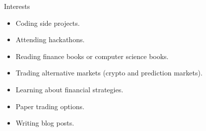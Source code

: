 \documentclass[]{mcdowellcv}
\begin{document}
	\begin{cvsection}{Interests}
		\begin{cvsubsection}{}{}{}
			\begin{itemize}
				\item Coding side projects.
				\item Attending hackathons.
				\item Reading finance books or computer science books.
				\item Trading alternative markets (crypto and prediction markets).
				\item Learning about financial strategies.
				\item Paper trading options.
				\item Writing blog posts.
			\end{itemize}
		\end{cvsubsection}
	\end{cvsection}

	
\end{document}
